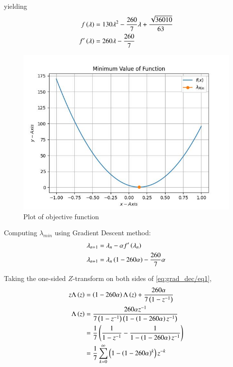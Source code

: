\documentclass[journal,12pt,twocolumn]{IEEEtran}
\begin{document}
yielding
\begin{align}
    f\left(\lambda\right) &= 130\lambda^2 -\frac{260}{7}\lambda + \frac{\sqrt{36010}}{63}\\
    f^\prime\left(\lambda\right) &= 260\lambda -\frac{260}{7}
\end{align}

\begin{figure}[!htb]
    \centering
    \includegraphics[width=\columnwidth]{figs/plot.jpg}
    \caption{Plot of objective function}
    \label{fig:Plot of objective function}
\end{figure}

Computing $\lambda_{min}$ using Gradient Descent method:
\begin{align}
	\lambda_{n+1} &= \lambda_n - \alpha f^\prime\left(\lambda_n\right)\\
    \label{eq:grad_dec/eq1}
	\lambda_{n+1} &= \lambda_n\left(1-260\alpha\right) -\frac{260}{7}\alpha
\end{align}

Taking the one-sided $Z$-transform on both sides of \eqref{eq:grad_dec/eq1},
\begin{align}
            \label{eq:grad_dec/Z-trans}
	    z\Lambda\left(z\right) &= \left(1-260\alpha\right)\Lambda\left(z\right) + \frac{260\alpha}{7\left(1-z^{-1}\right)} \\
	    \Lambda\left(z\right) &= \frac{260\alpha z^{-1}}{7\left(1-z^{-1}\right)\left(1-\left(1-260\alpha\right)z^{-1}\right)} \\
	    &= \frac{1}{7}\left( \frac{1}{1-z^{-1}} - \frac{1}{1-\left(1-260\alpha\right)z^{-1}}\right) \\
            \label{eq:grad_dec/lambda-z-trans}
	    &= \frac{1}{7}\sum_{k=0}^{\infty}\left(1-\left(1-260\alpha\right)^k\right)z^{-k}
\end{align}
\end{document}
